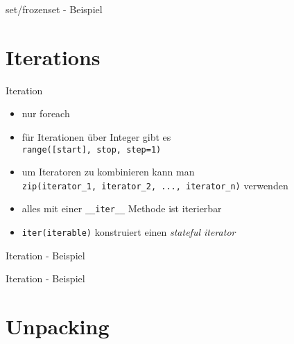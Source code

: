 \begin{frame}{set/frozenset - Beispiel}
	
\end{frame}


\section{Iterations}

\begin{frame}{Iteration}
	\begin{itemize}
		\item nur foreach
		\item für Iterationen über Integer gibt es \\ \hspace{0.5cm} \texttt{range([start], stop, step=1)}
		\item um Iteratoren zu kombinieren kann man \\ \hspace{0.5cm} \texttt{zip(iterator\_1, iterator\_2, ..., iterator\_n)} verwenden
		\item alles mit einer \alert{\texttt{\_\_iter\_\_}} Methode ist iterierbar
		\item \texttt{iter(iterable)} konstruiert einen \textit{stateful iterator}
	\end{itemize}
\end{frame}

\begin{frame}{Iteration - Beispiel}
	
\end{frame}

\begin{frame}{Iteration - Beispiel}
	
\end{frame}


\section{Unpacking}

